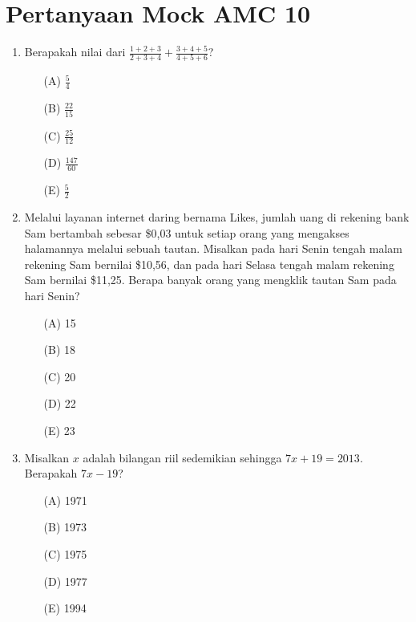 \documentclass[10pt]{article}
\begin{document}
\section*{Pertanyaan Mock AMC 10}

\begin{enumerate}
    \item Berapakah nilai dari $\frac{1+2+3}{2+3+4}+\frac{3+4+5}{4+5+6}$?
    \begin{itemize}
        \item[(A)] $\frac{5}{4}$
        \item[(B)] $\frac{22}{15}$
        \item[(C)] $\frac{25}{12}$
        \item[(D)] $\frac{147}{60}$
        \item[(E)] $\frac{5}{2}$
    \end{itemize}

    \item Melalui layanan internet daring bernama Likes, jumlah uang di rekening bank Sam bertambah sebesar \$0,03 untuk setiap orang yang mengakses halamannya melalui sebuah tautan. Misalkan pada hari Senin tengah malam rekening Sam bernilai \$10,56, dan pada hari Selasa tengah malam rekening Sam bernilai \$11,25. Berapa banyak orang yang mengklik tautan Sam pada hari Senin?
    \begin{itemize}
        \item[(A)] 15
        \item[(B)] 18
        \item[(C)] 20
        \item[(D)] 22
        \item[(E)] 23
    \end{itemize}

    \item Misalkan $x$ adalah bilangan riil sedemikian sehingga $7x+19=2013$. Berapakah $7x-19$?
    \begin{itemize}
        \item[(A)] 1971
        \item[(B)] 1973
        \item[(C)] 1975
        \item[(D)] 1977
        \item[(E)] 1994
    \end{itemize}


\end{enumerate}
\end{document}
